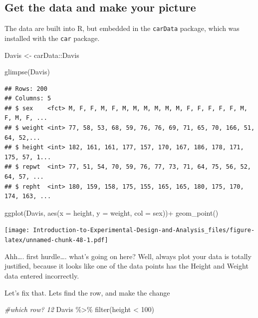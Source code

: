 \documentclass[
]{book}
\newenvironment{Shaded}{\begin{snugshade}}{\end{snugshade}}
\newcommand{\AttributeTok}[1]{\textcolor[rgb]{0.77,0.63,0.00}{#1}}
\newcommand{\CommentTok}[1]{\textcolor[rgb]{0.56,0.35,0.01}{\textit{#1}}}
\newcommand{\DecValTok}[1]{\textcolor[rgb]{0.00,0.00,0.81}{#1}}
\newcommand{\FunctionTok}[1]{\textcolor[rgb]{0.00,0.00,0.00}{#1}}
\newcommand{\NormalTok}[1]{#1}
\newcommand{\OtherTok}[1]{\textcolor[rgb]{0.56,0.35,0.01}{#1}}
\newcommand{\SpecialCharTok}[1]{\textcolor[rgb]{0.00,0.00,0.00}{#1}}
\begin{document}
\hypertarget{get-the-data-and-make-your-picture}{%
\subsection{Get the data and make your picture}\label{get-the-data-and-make-your-picture}}

The data are built into R, but embedded in the \texttt{carData} package, which was installed with the \texttt{car} package.

\begin{Shaded}
\begin{Highlighting}[]
\NormalTok{Davis }\OtherTok{\textless{}{-}}\NormalTok{ carData}\SpecialCharTok{::}\NormalTok{Davis}

\FunctionTok{glimpse}\NormalTok{(Davis)}
\end{Highlighting}
\end{Shaded}

\begin{verbatim}
## Rows: 200
## Columns: 5
## $ sex    <fct> M, F, F, M, F, M, M, M, M, M, M, F, F, F, F, F, M, F, M, F, ...
## $ weight <int> 77, 58, 53, 68, 59, 76, 76, 69, 71, 65, 70, 166, 51, 64, 52,...
## $ height <int> 182, 161, 161, 177, 157, 170, 167, 186, 178, 171, 175, 57, 1...
## $ repwt  <int> 77, 51, 54, 70, 59, 76, 77, 73, 71, 64, 75, 56, 52, 64, 57, ...
## $ repht  <int> 180, 159, 158, 175, 155, 165, 165, 180, 175, 170, 174, 163, ...
\end{verbatim}

\begin{Shaded}
\begin{Highlighting}[]
\FunctionTok{ggplot}\NormalTok{(Davis, }\FunctionTok{aes}\NormalTok{(}\AttributeTok{x =}\NormalTok{ height, }\AttributeTok{y =}\NormalTok{ weight, }\AttributeTok{col =}\NormalTok{ sex))}\SpecialCharTok{+}
  \FunctionTok{geom\_point}\NormalTok{()}
\end{Highlighting}
\end{Shaded}

\texttt{[image: Introduction-to-Experimental-Design-and-Analysis\_files/figure-latex/unnamed-chunk-48-1.pdf]}

Ahh\ldots. first hurdle\ldots. what's going on here? Well, always plot your data is totally justified, because it looks like one of the data points has the Height and Weight data entered incorrectly.

Let's fix that. Lets find the row, and make the change

\begin{Shaded}
\begin{Highlighting}[]
\CommentTok{\#which row? 12}
\NormalTok{Davis }\SpecialCharTok{\%\textgreater{}\%} \FunctionTok{filter}\NormalTok{(height }\SpecialCharTok{\textless{}} \DecValTok{100}\NormalTok{)}
\end{Highlighting}
\end{Shaded}
\end{document}
